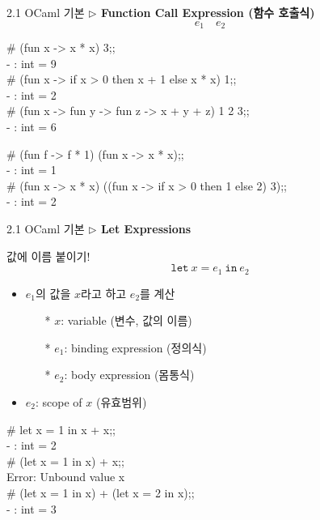 \documentclass[10pt]{beamer}
\begin{document}
	\begin{frame}{2.1 OCaml 기본}
		\textbf{$\triangleright$ Function Call Expression (함수 호출식)} \[
		e_1\quad e_2
		\]
		\begin{tcolorbox}[colback=backcolor]\ttfamily
			\# (fun x -> x * x) 3;;\\
			- : int = 9\\
			\# (fun x -> if x > 0 then x + 1 else x * x) 1;;\\
			- : int = 2\\
			\# (fun x -> fun y -> fun z -> x + y + z) 1 2 3;;\\
			- : int = 6
		\end{tcolorbox}
		
		\begin{tcolorbox}[colback=backcolor]\ttfamily
			\# (fun f -> f * 1) (fun x -> x * x);;\\
			- : int = 1\\
			\# (fun x -> x * x) ((fun x -> if x > 0 then 1 else 2) 3);;\\
			- : int = 2
		\end{tcolorbox}
	\end{frame}

	\begin{frame}{2.1 OCaml 기본}
		\textbf{$\triangleright$ Let Expressions}
		
		값에 이름 붙이기! \[
		\texttt{let}\ x = e_1\ \texttt{in}\ e_2
		\]
		\begin{itemize}
			\item $e_1$의 값을 $x$라고 하고 $e_2$를 계산
			\begin{itemize}
				\item[*] $x$: variable (변수, 값의 이름)
				\item[*] $e_1$: binding expression (정의식)
				\item[*] $e_2$: body expression (몸통식)
			\end{itemize}
			\item $e_2$: scope of $x$ (유효범위)
		\end{itemize}
		 \begin{tcolorbox}[colback=backcolor]\ttfamily
			\# let x = 1 in x + x;;\\
			- : int = 2\\
			\# (let x = 1 in x) + x;;\\
			Error: Unbound value x\\
			\# (let x = 1 in x) + (let x = 2 in x);; \\
			- : int = 3
		\end{tcolorbox}	
		\begin{itemize}
			\item[] 
			\item[] 
			\item[] 
			\item[] 
			\item[] 
		\end{itemize}
	\end{frame}
\end{document}
